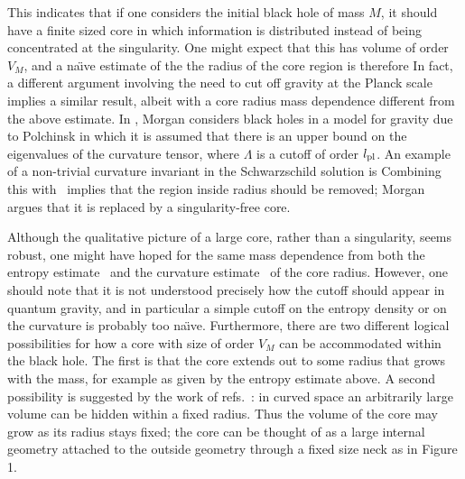 This indicates that if one considers the initial black hole of mass $M$,
it  should have a finite sized core
in which information is distributed instead of being concentrated at
the singularity.  One might expect that this has volume of order $V_M$,
and a  na\"\i ve estimate of the the radius of the core region is therefore
%
\eqn{}
%
In fact, a different argument
involving the need to cut off gravity at the Planck scale implies a
similar
result, albeit with a core radius mass dependence different
from the above estimate.
In , Morgan considers black holes in a
model for gravity due to Polchinsk {\Polc} in which it is
assumed that there is an upper bound on the eigenvalues of the
curvature tensor,
%
\eqn{}
%
where $\Lambda$ is a cutoff of order $l_{\rm pl}$.
An example of a non-trivial curvature invariant in the Schwarzschild
solution is
%
\eqn{}
%
Combining this with \curvbd\ implies that the region inside
radius
%
\eqn{}
%
should be removed;  Morgan argues that it is
replaced by a singularity-free core.

Although the qualitative picture  of a large core, rather than a
singularity, seems robust, one might have hoped for the same mass dependence
from both the entropy estimate \ebound\ and the curvature estimate \cbound\
of the core
radius.  However, one
should note that it is not understood precisely how the cutoff should
appear in quantum gravity, and in particular a simple cutoff on
the entropy density or on the curvature is probably too na\"\i ve.
Furthermore, there are two different logical possibilities for how a core
with size of order $V_M$ can be accommodated within the black hole.  The first
is that the core extends out to some radius that grows with the mass, for
example as given by the entropy estimate above. A second possibility
is suggested by the work of refs.~\refs{\BDDO,\DXBH}:
in curved space an arbitrarily large volume can be hidden within a fixed
radius.  Thus the volume of the core may grow as its radius stays fixed;
the core
can be thought of as a large internal geometry
attached to the outside geometry through a
fixed size neck as in Figure 1.

